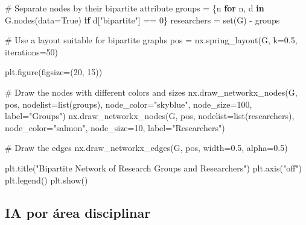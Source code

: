 \documentclass[
  brazilian,
  letterpaper,
  DIV=11,
  numbers=noendperiod]{scrartcl}
\newenvironment{Shaded}{\begin{snugshade}}{\end{snugshade}}
\newcommand{\BuiltInTok}[1]{\textcolor[rgb]{0.00,0.23,0.31}{#1}}
\newcommand{\CommentTok}[1]{\textcolor[rgb]{0.37,0.37,0.37}{#1}}
\newcommand{\ControlFlowTok}[1]{\textcolor[rgb]{0.00,0.23,0.31}{\textbf{#1}}}
\newcommand{\DecValTok}[1]{\textcolor[rgb]{0.68,0.00,0.00}{#1}}
\newcommand{\FloatTok}[1]{\textcolor[rgb]{0.68,0.00,0.00}{#1}}
\newcommand{\KeywordTok}[1]{\textcolor[rgb]{0.00,0.23,0.31}{\textbf{#1}}}
\newcommand{\NormalTok}[1]{\textcolor[rgb]{0.00,0.23,0.31}{#1}}
\newcommand{\OperatorTok}[1]{\textcolor[rgb]{0.37,0.37,0.37}{#1}}
\newcommand{\StringTok}[1]{\textcolor[rgb]{0.13,0.47,0.30}{#1}}
\newcommand{\VariableTok}[1]{\textcolor[rgb]{0.07,0.07,0.07}{#1}}
\begin{document}
\begin{Shaded}
\begin{Highlighting}[]
\CommentTok{\# Separate nodes by their bipartite attribute}
\NormalTok{groups }\OperatorTok{=}\NormalTok{ \{n }\ControlFlowTok{for}\NormalTok{ n, d }\KeywordTok{in}\NormalTok{ G.nodes(data}\OperatorTok{=}\VariableTok{True}\NormalTok{) }\ControlFlowTok{if}\NormalTok{ d[}\StringTok{"bipartite"}\NormalTok{] }\OperatorTok{==} \DecValTok{0}\NormalTok{\}}
\NormalTok{researchers }\OperatorTok{=} \BuiltInTok{set}\NormalTok{(G) }\OperatorTok{{-}}\NormalTok{ groups}

\CommentTok{\# Use a layout suitable for bipartite graphs}
\NormalTok{pos }\OperatorTok{=}\NormalTok{ nx.spring\_layout(G, k}\OperatorTok{=}\FloatTok{0.5}\NormalTok{, iterations}\OperatorTok{=}\DecValTok{50}\NormalTok{)}

\NormalTok{plt.figure(figsize}\OperatorTok{=}\NormalTok{(}\DecValTok{20}\NormalTok{, }\DecValTok{15}\NormalTok{))}

\CommentTok{\# Draw the nodes with different colors and sizes}
\NormalTok{nx.draw\_networkx\_nodes(G, pos, nodelist}\OperatorTok{=}\BuiltInTok{list}\NormalTok{(groups), node\_color}\OperatorTok{=}\StringTok{"skyblue"}\NormalTok{, node\_size}\OperatorTok{=}\DecValTok{100}\NormalTok{, label}\OperatorTok{=}\StringTok{"Groups"}\NormalTok{)}
\NormalTok{nx.draw\_networkx\_nodes(G, pos, nodelist}\OperatorTok{=}\BuiltInTok{list}\NormalTok{(researchers), node\_color}\OperatorTok{=}\StringTok{"salmon"}\NormalTok{, node\_size}\OperatorTok{=}\DecValTok{10}\NormalTok{, label}\OperatorTok{=}\StringTok{"Researchers"}\NormalTok{)}

\CommentTok{\# Draw the edges}
\NormalTok{nx.draw\_networkx\_edges(G, pos, width}\OperatorTok{=}\FloatTok{0.5}\NormalTok{, alpha}\OperatorTok{=}\FloatTok{0.5}\NormalTok{)}

\NormalTok{plt.title(}\StringTok{"Bipartite Network of Research Groups and Researchers"}\NormalTok{)}
\NormalTok{plt.axis(}\StringTok{"off"}\NormalTok{)}
\NormalTok{plt.legend()}
\NormalTok{plt.show()}
\end{Highlighting}
\end{Shaded}

\subsection{IA por área disciplinar}\label{ia-por-uxe1rea-disciplinar}
\end{document}
